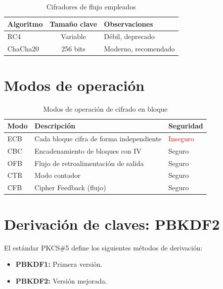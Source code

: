 \begin{table}[H]
    \centering
    \caption{Cifradores de flujo empleados}
    \begin{tabularx}{\textwidth}{l|c|p{5cm}}
        \toprule
        \textbf{Algoritmo} & \textbf{Tamaño clave} & \textbf{Observaciones} \\
        \midrule
        RC4 & Variable & Débil, deprecado \\
        ChaCha20 & 256 bits & Moderno, recomendado \\
        \bottomrule
    \end{tabularx}
\end{table}

\section{Modos de operación}

\begin{table}[H]
    \centering
    \caption{Modos de operación de cifrado en bloque}
    \begin{tabularx}{\textwidth}{l|p{6cm}|p{3cm}}
        \toprule
        \textbf{Modo} & \textbf{Descripción} & \textbf{Seguridad} \\
        \midrule
        ECB & Cada bloque cifra de forma independiente & \textcolor{red}{Inseguro} \\
        CBC & Encadenamiento de bloques con IV & Seguro \\
        OFB & Flujo de retroalimentación de salida & Seguro \\
        CTR & Modo contador & Seguro \\
        CFB & Cipher Feedback (flujo) & Seguro \\
        \bottomrule
    \end{tabularx}
\end{table}

\section{Derivación de claves: PBKDF2}

El estándar PKCS\#5 define los siguientes métodos de derivación:

\begin{itemize}[label=\textbullet]
    \item \textbf{PBKDF1:} Primera versión.
    \item \textbf{PBKDF2:} Versión mejorada.
\end{itemize}

